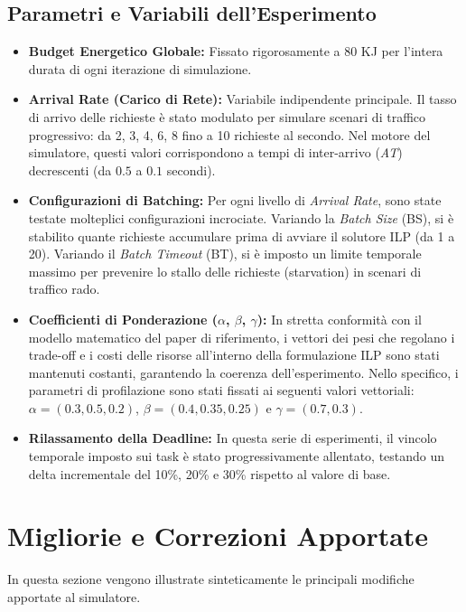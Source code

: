 \documentclass[11pt,a4paper]{article}
\begin{document}
\subsection{Parametri e Variabili dell'Esperimento}
\begin{itemize}
    \item \textbf{Budget Energetico Globale:} Fissato rigorosamente a 80 KJ per l'intera durata di ogni iterazione di simulazione.
    \item \textbf{Arrival Rate (Carico di Rete):} Variabile indipendente principale. Il tasso di arrivo delle richieste è stato modulato per simulare scenari di traffico progressivo: da 2, 3, 4, 6, 8 fino a 10 richieste al secondo. Nel motore del simulatore, questi valori corrispondono a tempi di inter-arrivo (\textit{AT}) decrescenti (da $0.5$ a $0.1$ secondi).
    \item \textbf{Configurazioni di Batching:} Per ogni livello di \textit{Arrival Rate}, sono state testate molteplici configurazioni incrociate. Variando la \textit{Batch Size} (BS), si è stabilito quante richieste accumulare prima di avviare il solutore ILP (da 1 a 20). Variando il \textit{Batch Timeout} (BT), si è imposto un limite temporale massimo per prevenire lo stallo delle richieste (starvation) in scenari di traffico rado.
    \item \textbf{Coefficienti di Ponderazione ($\alpha$, $\beta$, $\gamma$):} In stretta conformità con il modello matematico del paper di riferimento, i vettori dei pesi che regolano i trade-off e i costi delle risorse all'interno della formulazione ILP sono stati mantenuti costanti, garantendo la coerenza dell'esperimento. Nello specifico, i parametri di profilazione sono stati fissati ai seguenti valori vettoriali: $\alpha = (0.3, 0.5, 0.2)$, $\beta = (0.4, 0.35, 0.25)$ e $\gamma = (0.7, 0.3)$.
    \item \textbf{Rilassamento della Deadline:} In questa serie di esperimenti, il vincolo temporale imposto sui task è stato progressivamente allentato, testando un delta incrementale del 10\%, 20\% e 30\% rispetto al valore di base.
\end{itemize}

\section{Migliorie e Correzioni Apportate}
In questa sezione vengono illustrate sinteticamente le principali modifiche apportate al simulatore. 
\end{document}
